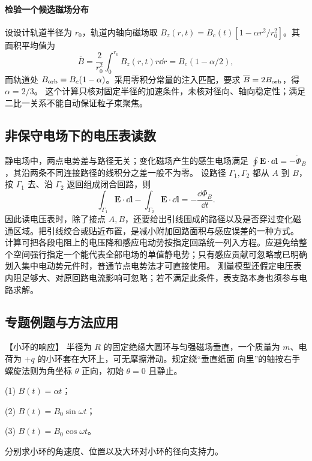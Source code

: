 {%
\paragraph{检验一个候选磁场分布}
设设计轨道半径为 $r_0$，轨道内轴向磁场取
$B_z(r,t)=B_c(t)[1-\alpha r^2/r_0^2]$。其面积平均值为
\[
 \overline B=\frac2{r_0^2}\int_0^{r_0}B_z(r,t)r\dd r
 =B_c(1-\alpha/2),
\]
而轨道处 $B_{\rm orb}=B_c(1-\alpha)$。采用零积分常量的注入匹配，要求 $\overline B=2B_{\rm orb}$，得 $\alpha=2/3$。
这个计算只核对固定半径的加速条件，未核对径向、轴向稳定性；满足二比一关系不能自动保证粒子束聚焦。


\subsection{非保守电场下的电压表读数}
静电场中，两点电势差与路径无关；变化磁场产生的感生电场满足 $\oint\boldsymbol E\cdot\dd\boldsymbol l=-\dot\Phi_B$，其沿两条不同连接路径的线积分之差一般不为零。
设路径 $\Gamma_1,\Gamma_2$ 都从 $A$ 到 $B$，按 $\Gamma_1$ 去、沿 $\Gamma_2$ 返回组成闭合回路，则
\[
 \int_{\Gamma_1}\boldsymbol E\cdot\dd\boldsymbol l-
 \int_{\Gamma_2}\boldsymbol E\cdot\dd\boldsymbol l=-\frac{\dd\Phi_B}{\dd t}.
\]
因此读电压表时，除了接点 $A,B$，还要给出引线围成的路径以及是否穿过变化磁通区域。把引线绞合或贴近布置，是减小附加回路面积与感应误差的一种方式。
计算可把各段电阻上的电压降和感应电动势按指定回路统一列入方程。应避免给整个空间强行指定一个能代表全部电场的单值静电势；只有感应贡献可忽略或已明确划入集中电动势元件时，普通节点电势法才可直接使用。
测量模型还假定电压表内阻足够大、对原回路电流影响可忽略；若不满足此条件，表支路本身也须参与电路求解。


\subsection{专题例题与方法应用}

\begin{origexamplebox}{【小环的响应】}\label{ch24:ex:s40-9-10}
半径为 $R$ 的固定绝缘大圆环与匀强磁场垂直，一个质量为 $m$、电荷为 $+q$ 的小环套在大环上，可无摩擦滑动。规定绕“垂直纸面
向里”的轴按右手螺旋法则为角坐标 $\theta$ 正向，初始 $\theta=0$ 且静止。

(1) $B(t)=\alpha t$；

(2) $B(t)=B_0\sin\omega t$；

(3) $B(t)=B_0\cos\omega t$。

分别求小环的角速度、位置以及大环对小环的径向支持力。
\par\noindent\begin{minipage}{\linewidth}
\chargedRingDiagram
{}
\end{minipage}\par\medskip
\end{origexamplebox}

}
